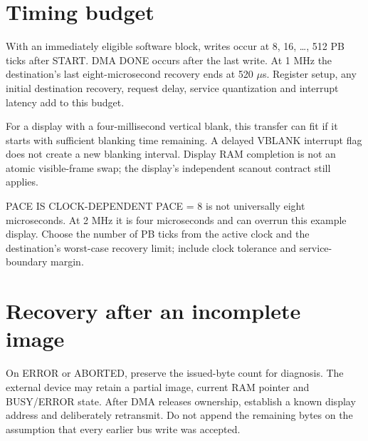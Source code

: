 \documentclass[10pt]{article}
\begin{document}
\section*{Timing budget}
With an immediately eligible software block, writes occur at 8, 16, \ldots, 512 PB ticks after START. DMA DONE occurs after the last write. At 1 MHz the destination's last eight-microsecond recovery ends at 520 $\mu$s. Register setup, any initial destination recovery, request delay, service quantization and interrupt latency add to this budget.

For a display with a four-millisecond vertical blank, this transfer can fit if it starts with sufficient blanking time remaining. A delayed VBLANK interrupt flag does not create a new blanking interval. Display RAM completion is not an atomic visible-frame swap; the display's independent scanout contract still applies.
\begin{Notice}{PACE IS CLOCK-DEPENDENT}
PACE = 8 is not universally eight microseconds. At 2 MHz it is four microseconds and can overrun this example display. Choose the number of PB ticks from the active clock and the destination's worst-case recovery limit; include clock tolerance and service-boundary margin.
\end{Notice}
\section*{Recovery after an incomplete image}
On ERROR or ABORTED, preserve the issued-byte count for diagnosis. The external device may retain a partial image, current RAM pointer and BUSY/ERROR state. After DMA releases ownership, establish a known display address and deliberately retransmit. Do not append the remaining bytes on the assumption that every earlier bus write was accepted.
\vfill{}
\end{document}
